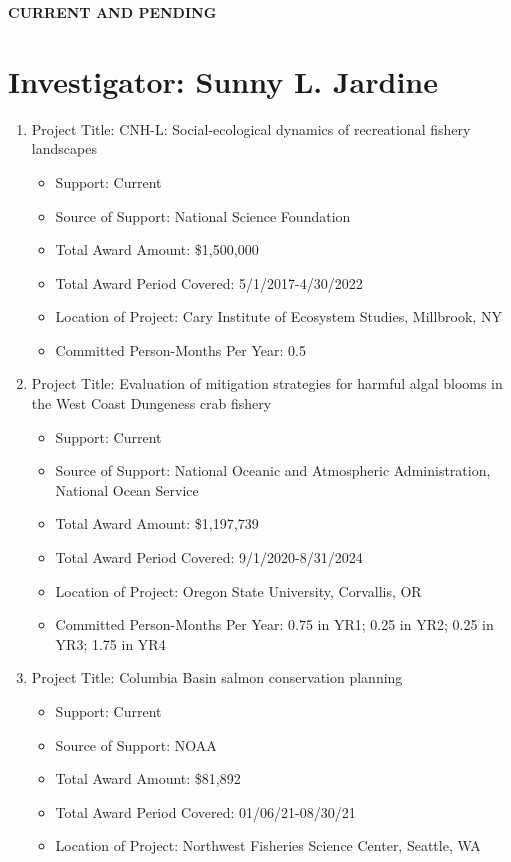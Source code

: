 \documentclass[12pt]{elsarticle}
\begin{document}
\begin{center} \textbf{CURRENT AND PENDING} \end{center}

\section*{Investigator: Sunny L. Jardine}

\begin{enumerate}
\item Project Title: CNH-L: Social-ecological dynamics of recreational fishery landscapes
\begin{itemize}
\item Support: Current
\item Source of Support: National Science Foundation
\item Total Award Amount: \$1,500,000
\item Total Award Period Covered: 5/1/2017-4/30/2022
\item Location of Project: Cary Institute of Ecosystem Studies, Millbrook, NY
\item Committed Person-Months Per Year: 0.5
\end{itemize}
\item Project Title: Evaluation of mitigation strategies for harmful algal blooms in the West Coast Dungeness crab fishery
\begin{itemize}
\item Support: Current
\item Source of Support: National Oceanic and Atmospheric Administration, National Ocean Service
\item Total Award Amount: \$1,197,739
\item Total Award Period Covered: 9/1/2020-8/31/2024
\item Location of Project: Oregon State University, Corvallis, OR
\item Committed Person-Months Per Year: 0.75 in YR1; 0.25 in YR2; 0.25 in YR3; 1.75 in YR4
\end{itemize}
\item Project Title: Columbia Basin salmon conservation planning
\begin{itemize}
\item Support: Current
\item Source of Support: NOAA
\item Total Award Amount: \$81,892
\item Total Award Period Covered: 01/06/21-08/30/21
\item Location of Project: Northwest Fisheries Science Center, Seattle, WA

\end{itemize}
\end{enumerate}
\end{document}
